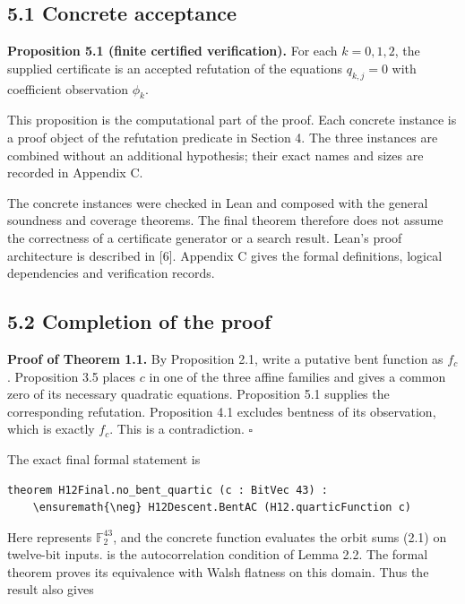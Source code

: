 \documentclass[11pt,a4paper]{article}
\begin{document}
\subsection*{5.1 Concrete acceptance}

\textbf{Proposition 5.1 (finite certified verification).} For each $k=0,1,2$, the supplied certificate is an accepted refutation of the equations $q_{k,j}=0$ with coefficient observation $\phi_k$.

This proposition is the computational part of the proof. Each concrete instance is a proof object of the refutation predicate in Section 4. The three instances are combined without an additional hypothesis; their exact names and sizes are recorded in Appendix C.

The concrete instances were checked in Lean and composed with the general soundness and coverage theorems. The final theorem therefore does not assume the correctness of a certificate generator or a search result. Lean's proof architecture is described in [6]. Appendix C gives the formal definitions, logical dependencies and verification records.

\subsection*{5.2 Completion of the proof}

\textbf{Proof of Theorem 1.1.} By Proposition 2.1, write a putative bent function as $f_c$. Proposition 3.5 places $c$ in one of the three affine families and gives a common zero of its necessary quadratic equations. Proposition 5.1 supplies the corresponding refutation. Proposition 4.1 excludes bentness of its observation, which is exactly $f_c$. This is a contradiction. \hfill$\square$

The exact final formal statement is

\begin{Verbatim}[fontsize=\scriptsize,breaklines=true,breakanywhere=true,commandchars=\\\{\}]
theorem H12Final.no_bent_quartic (c : BitVec 43) :
    \ensuremath{\neg} H12Descent.BentAC (H12.quarticFunction c)
\end{Verbatim}

Here  represents $\mathbb F_2^{43}$, and the concrete function evaluates the orbit sums (2.1) on twelve-bit inputs.  is the autocorrelation condition of Lemma 2.2. The formal theorem  proves its equivalence with Walsh flatness on this domain. Thus the result also gives
\end{document}
